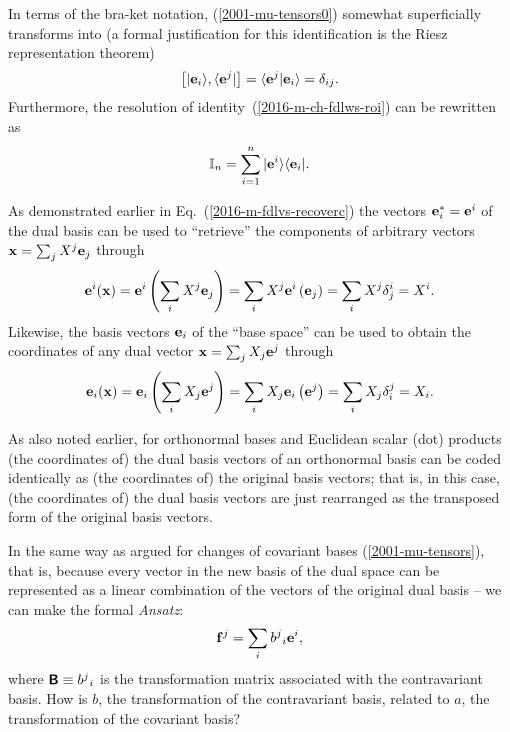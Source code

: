 In terms of the bra-ket notation, (\ref{2001-mu-tensors0}) somewhat superficially transforms into
(a formal justification for this identification is the Riesz representation theorem)
\begin{equation}
\left [ \vert {\bf e}_i \rangle , \langle  {\bf e}^j \vert \right]=
\langle  {\bf e}^j \vert {\bf e}_i \rangle =
  \delta_{ij}
.
\label{2001-mu-tensors0bk}
\end{equation}
Furthermore, the resolution of identity~(\ref{2016-m-ch-fdlws-roi}) can be rewritten as
\begin{equation}
 {\Bbb I}_n = \sum_{i=1}^n \vert {\bf e}^i \rangle \langle {\bf e}_i \vert
.
\label{2016-m-ch-tensor-roi}
\end{equation}

As demonstrated earlier in Eq.~(\ref{2016-m-fdlvs-recoverc}) the vectors ${\bf e}^\ast_i = {\bf e}^i$ of the dual basis can be used to ``retrieve'' the components of arbitrary vectors
${\bf x} = \sum_j X^j {\bf e}_j$  through
\begin{equation}
{\bf e}^i ( {\bf x} ) =
{\bf e}^i \left( \sum_i X^j {\bf e}_j \right) =
\sum_i  X^j {\bf e}^i \left({\bf e}_j \right) =
\sum_i  X^j \delta^i_j =
 X^i.
\label{2016-m-tensor-recoverc}
\end{equation}
Likewise, the basis vectors ${\bf e}_i$ of the ``base space'' can be used to obtain the coordinates of any dual vector ${\bf x} = \sum_j X_j {\bf e}^j$  through
\begin{equation}
{\bf e}_i ( {\bf x} ) =
{\bf e}_i \left( \sum_i X_j {\bf e}^j \right) =
\sum_i  X_j {\bf e}_i \left({\bf e}^j \right) =
\sum_i  X_j \delta_i^j =
 X_i.
\label{2016-m-tensor-recoverc2}
\end{equation}


As also noted earlier,  for orthonormal bases and Euclidean scalar (dot) products (the coordinates of) the dual basis vectors of an orthonormal basis can be coded identically
as  (the coordinates of) the original basis vectors; that is,
in this case,
(the coordinates of) the dual basis vectors are just rearranged as the transposed form of the original basis vectors.


In the same way as argued for changes of covariant bases (\ref{2001-mu-tensors}),
that is, because every vector in the new basis of the dual space can be represented as a linear combination of the vectors of the original dual basis -- we can make the formal {\it Ansatz}:
\begin{equation}
{\bf f}^j=\sum_i{b^j}_i{\bf e}^i,
\label{2016-m-ch-tensor-tocontravb}
\end{equation}
where $ \textsf{\textbf{B}} \equiv {b^j}_i$ is
the transformation matrix associated with the contravariant basis.
How is $b$, the transformation of the contravariant basis, related to $a$,
the transformation of the covariant basis?

